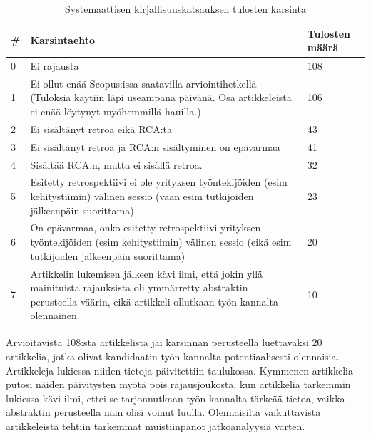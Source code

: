 \begin{table}
    \begin{tabular}{|p{0.5cm}|p{11.5cm}|p{2cm}|}
        \hline
        \textbf{\#} & \textbf{Karsintaehto} & \textbf{Tulosten määrä} \\ \hline
        0 & Ei rajausta                                                                                                                                               & 108            \\ \hline
        1 & Ei ollut enää Scopus:issa saatavilla arviointihetkellä (Tuloksia käytiin läpi useampana päivänä. Osa artikkeleista ei enää löytynyt myöhemmillä hauilla.) & 106            \\ \hline
        2 & Ei sisältänyt retroa eikä RCA:ta                                                                                                                          & 43             \\ \hline
        3 & Ei sisältänyt retroa ja RCA:n sisältyminen on epävarmaa                                                                                                   & 41             \\ \hline
        4 & Sisältää RCA:n, mutta ei sisällä retroa.                                                                                                                  & 32             \\ \hline
        5 & Esitetty retrospektiivi ei ole yrityksen työntekijöiden (esim kehitystiimin) välinen sessio (vaan esim tutkijoiden jälkeenpäin suorittama)                & 23             \\ \hline
        6 & On epävarmaa, onko esitetty retrospektiivi yrityksen työntekijöiden (esim kehitystiimin) välinen sessio (eikä esim tutkijoiden jälkeenpäin suorittama)    & 20             \\
        \hline
        7 & Artikkelin lukemisen jälkeen kävi ilmi, että jokin yllä mainituista rajauksista oli ymmärretty abstraktin perusteella väärin, eikä artikkeli ollutkaan työn kannalta olennainen. & 10 \\ \hline
    \end{tabular}
    \caption{Systemaattisen kirjallisuuskatsauksen tulosten karsinta}
    \label{tab:karsintaehdot_taulukko}
\end{table}

Arvioitavista 108:sta artikkelista jäi karsinnan perusteella luettavaksi 20 artikkelia, jotka olivat kandidaatin työn kannalta potentiaalisesti olennaisia. Artikkeleja lukiessa niiden tietoja päivitettiin taulukossa. Kymmenen artikkelia putosi näiden päivitysten myötä pois rajausjoukosta, kun artikkelia tarkemmin lukiessa kävi ilmi, ettei se tarjonnutkaan työn kannalta tärkeää tietoa, vaikka abstraktin perusteella näin olisi voinut luulla. Olennaisilta vaikuttavista artikkeleista tehtiin tarkemmat muistiinpanot jatkoanalyysiä varten.

